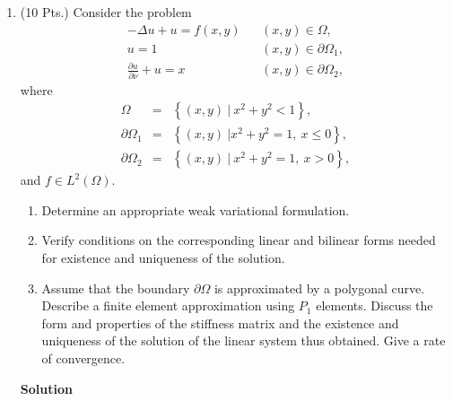 \documentclass{article}
\begin{document}
\begin{enumerate}
\begin{enumerate}
\end{enumerate}



\item (10 Pts.) Consider the problem
\begin{eqnarray*}
-\Delta u + u = f(x,y) & & (x,y) \in \Omega, \\
u = 1 & & (x,y) \in \partial\Omega_1, \\
\frac{\partial u}{\partial \nu} + u = x & & (x,y) \in \partial\Omega_2,
\end{eqnarray*}
where
\begin{eqnarray*}
\Omega & = & \left\{ (x,y) \ | \ x^2 + y^2 < 1 \right\}, \\
\partial\Omega_1 & = & \left\{ (x,y) \ | x^2 + y^2 = 1, \ x \leq 0 \right\}, \\
\partial\Omega_2 & = & \left\{ (x,y) \ | \ x^2 + y^2 = 1, \ x > 0 \right\},
\end{eqnarray*}
and \(f \in L^2(\Omega)\).

\begin{enumerate}
\item Determine an appropriate weak variational formulation.

\item Verify conditions on the corresponding linear and bilinear forms needed for existence and uniqueness of the solution.

\item Assume that the boundary \(\partial\Omega\) is approximated by a polygonal curve.  Describe a finite element approximation using \(P_1\) elements.  Discuss the form and properties of the stiffness matrix and the existence and uniqueness of the solution of the linear system thus obtained.  Give a rate of convergence.

\end{enumerate}

{\bf Solution}


\end{enumerate}
\end{document}
